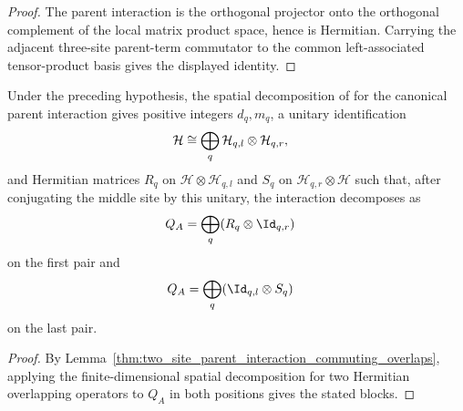 \begin{proof}\leanok
    The parent interaction is the orthogonal projector onto the orthogonal
    complement of the local matrix product space, hence is Hermitian.
    Carrying the adjacent three-site parent-term commutator to the common
    left-associated tensor-product basis gives the displayed identity.
\end{proof}

\begin{lemma}%
    \label{thm:two_site_parent_interaction_spatial_blocks}
    \leanok
    Under the preceding hypothesis, the spatial decomposition of
    \cite[Lemma~2.1]{Beigi2012Classification} for the canonical parent
    interaction gives positive integers
    $d_q,m_q$, a unitary identification
    \begin{align}
        \mathcal H
         & \cong
        \bigoplus_q
        \mathcal H_{q,l}\otimes\mathcal H_{q,r},
        \notag
    \end{align}
    and Hermitian matrices $R_q$ on
    $\mathcal H\otimes\mathcal H_{q,l}$ and $S_q$ on
    $\mathcal H_{q,r}\otimes\mathcal H$ such that, after conjugating the
    middle site by this unitary, the interaction decomposes as
    \begin{align}
        Q_A
         & =
        \bigoplus_q(R_q\otimes\Id_{q,r})
        \notag
    \end{align}
    on the first pair and
    \begin{align}
        Q_A
         & =
        \bigoplus_q(\Id_{q,l}\otimes S_q)
        \notag
    \end{align}
    on the last pair.
\end{lemma}

\begin{proof}\leanok
    By Lemma~\ref{thm:two_site_parent_interaction_commuting_overlaps},
    applying the finite-dimensional spatial decomposition for two Hermitian
    overlapping operators to $Q_A$ in both positions gives the stated blocks.
\end{proof}

